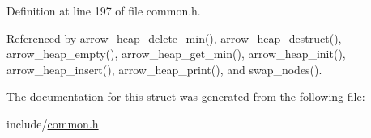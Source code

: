 Definition at line 197 of file common.h.

Referenced by arrow\_\-heap\_\-delete\_\-min(), arrow\_\-heap\_\-destruct(), arrow\_\-heap\_\-empty(), arrow\_\-heap\_\-get\_\-min(), arrow\_\-heap\_\-init(), arrow\_\-heap\_\-insert(), arrow\_\-heap\_\-print(), and swap\_\-nodes().

The documentation for this struct was generated from the following file:\begin{CompactItemize}
\item 
include/\hyperlink{common_8h}{common.h}\end{CompactItemize}
